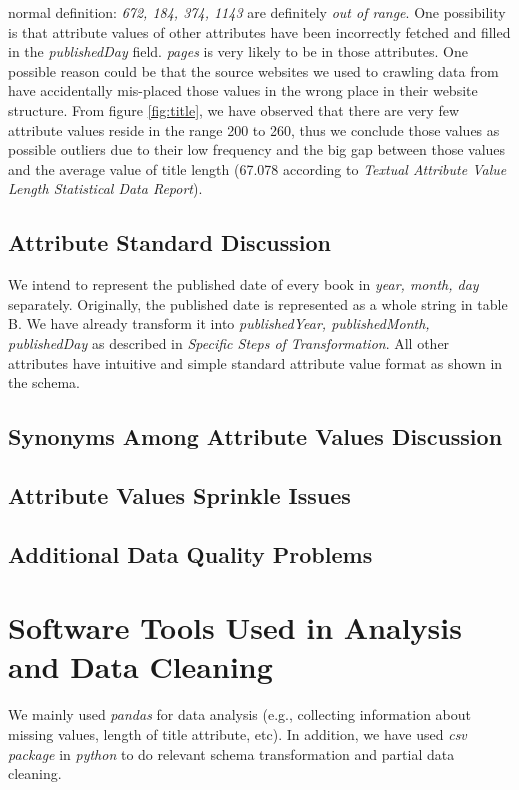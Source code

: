 \documentclass[10pt, oneside]{article}
\begin{document}
normal definition: \textit{672, 184, 374, 1143} are definitely \textit{out of range}. One possibility is that attribute values of other attributes have been incorrectly 
fetched and filled in the \textit{publishedDay} field. \textit{pages} is very likely to be in those attributes. One possible reason could be that the source websites
we used to crawling data from have accidentally mis-placed those values in the wrong place in their website structure. From figure \ref{fig:title}, we have observed 
that there are very few attribute values reside in the range 200 to 260, thus we conclude those values as possible outliers due to their low frequency and the big 
gap between those values and the average value of title length (67.078 according to \textit{Textual Attribute Value Length Statistical Data Report}).

\subsection*{Attribute Standard Discussion}
We intend to represent the published date of every book in \textit{year, month, day} separately. Originally, the published date is represented as a whole string in 
table B. We have already transform it into \textit{publishedYear, publishedMonth, publishedDay} as described in \textit{Specific Steps of Transformation}. All other 
attributes have intuitive and simple standard attribute value format as shown in the schema.
\subsection*{Synonyms Among Attribute Values Discussion}
\subsection*{Attribute Values Sprinkle Issues}
\subsection*{Additional Data Quality Problems}
\section*{Software Tools Used in Analysis and Data Cleaning}
We mainly used \textit{pandas} for data analysis (e.g., collecting information about missing values, length of title attribute, etc). In addition, we have used \textit{csv package} 
in \textit{python} to do relevant schema transformation and partial data cleaning.  
\end{document}
